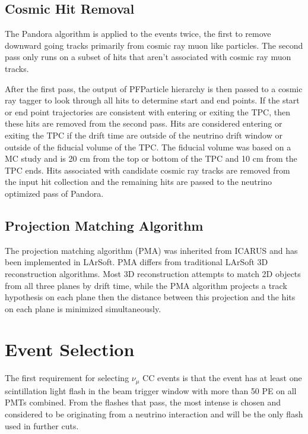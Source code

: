 \subsection{Cosmic Hit Removal}
The Pandora algorithm is applied to the events twice, the first to remove downward going tracks primarily from cosmic ray muon like particles. The second pass only runs on a subset of hits that aren't associated with cosmic ray muon tracks. 

After the first pass, the output of PFParticle hierarchy is then passed to a cosmic ray tagger to look through all hits to determine start and end points. If the start or end point trajectories are consistent with entering or exiting the TPC, then these hits are removed from the second pass. Hits are considered entering or exiting the TPC if the drift time are outside of the neutrino drift window or outside of the fiducial volume of the TPC. The fiducial volume was based on a MC study and is 20 cm from the top or bottom of the TPC and 10 cm from the TPC ends. Hits associated with candidate cosmic  ray tracks are removed from the input hit collection and the remaining hits are passed to the neutrino optimized pass of Pandora.


\subsection{Projection Matching Algorithm}
The projection matching algorithm (PMA) was inherited from ICARUS and has been implemented in LArSoft. PMA differs from traditional LArSoft 3D reconstruction algorithms. Most 3D reconstruction attempts to match 2D objects from all three planes by drift time, while the PMA algorithm projects a track hypothesis on each plane then the distance between this projection and the hits on each plane is minimized simultaneously.
\section{Event Selection}\label{section:eventselection}
The first requirement for selecting $\nu_{\mu}$ CC events is that the event has at least one scintillation light flash in the beam trigger window with more than 50 PE on all PMTs combined. From the flashes that pass, the most intense is chosen and considered to be originating from a neutrino interaction and will be the only flash used in further cuts. 


